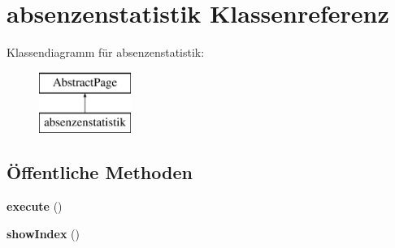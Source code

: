 \hypertarget{classabsenzenstatistik}{}\section{absenzenstatistik Klassenreferenz}
\label{classabsenzenstatistik}
Klassendiagramm für absenzenstatistik\+:\begin{figure}[H]
\begin{center}
\leavevmode
\includegraphics[height=2.000000cm]{classabsenzenstatistik}
\end{center}
\end{figure}
\subsection*{Öffentliche Methoden}
\begin{DoxyCompactItemize}
\item 
\mbox{\label{classabsenzenstatistik_a462bf57b40c56111c42e4f9d2654d1c6}} 
{\bfseries execute} ()
\item 
\mbox{\label{classabsenzenstatistik_ac950cfe229cb3068b4d55bea7aa32a06}} 
{\bfseries show\+Index} ()
\end{DoxyCompactItemize}
